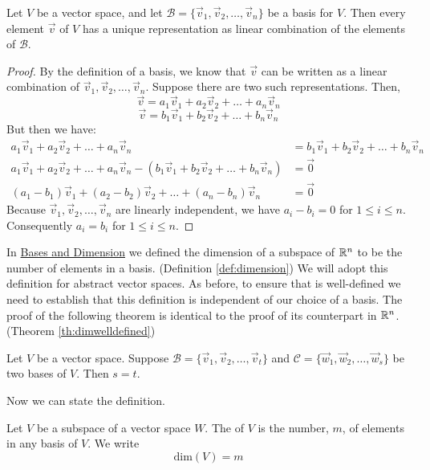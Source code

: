 \documentclass{ximera}
\begin{document}
\begin{theorem}\label{th:uniquerep}
Let $V$ be a vector space, and let $\mathcal{B}=\{\vec{v}_1, \vec{v}_2,\ldots,\vec{v}_n\}$ be a basis for $V$.  Then every element $\vec{v}$ of $V$ has a unique representation as linear combination of the elements of $\mathcal{B}$.
\end{theorem}
\begin{proof}
By the definition of a basis, we know that $\vec{v}$ can be written as a linear combination of $\vec{v}_1, \vec{v}_2,\ldots,\vec{v}_n$.  Suppose there are two such representations.  Then,
$$\vec{v}=a_1\vec{v}_1+ a_2\vec{v}_2+\ldots+a_n\vec{v}_n$$
$$\vec{v}=b_1\vec{v}_1+ b_2\vec{v}_2+\ldots+b_n\vec{v}_n$$
But then we have:
\begin{align*}
a_1\vec{v}_1+ a_2\vec{v}_2+\ldots+a_n\vec{v}_n&=b_1\vec{v}_1+ b_2\vec{v}_2+\ldots+b_n\vec{v}_n\\
a_1\vec{v}_1+ a_2\vec{v}_2+\ldots+a_n\vec{v}_n-(b_1\vec{v}_1+ b_2\vec{v}_2+\ldots+b_n\vec{v}_n)&=\vec{0}\\
(a_1-b_1)\vec{v}_1+ (a_2-b_2)\vec{v}_2+\ldots+(a_n-b_n)\vec{v}_n&=\vec{0}
\end{align*}
Because $\vec{v}_1, \vec{v}_2,\ldots,\vec{v}_n$ are linearly independent, we have $a_i-b_i=0$ for $1\leq i\leq n$. Consequently $a_i=b_i$ for $1\leq i\leq n$.
\end{proof}

In \href{https://ximera.osu.edu/linearalgebradzv3/LinearAlgebraInteractiveIntro/VSP-0035/main}{Bases and Dimension} we defined the dimension of a subspace of $\mathbb{R}^n$ to be the number of elements in a basis. (Definition \ref{def:dimension})  We will adopt this definition for abstract vector spaces.  As before, to ensure that  is well-defined we need to establish that this definition is independent of our choice of a basis.  The proof of the following theorem is identical to the proof of its counterpart in $\mathbb{R}^n$.  (Theorem \ref{th:dimwelldefined})

\begin{theorem}\label{th:dimwelldefinedabstract}
Let $V$ be a vector space.  Suppose $\mathcal{B}=\{\vec{v}_1, \vec{v}_2,\ldots ,\vec{v}_t\}$ and $\mathcal{C}=\{\vec{w}_1, \vec{w}_2,\ldots ,\vec{w}_s\}$ be two bases of $V$.  Then $s=t$.
\end{theorem}
Now we can state the definition.

\begin{definition}\label{def:dimensionabstract}
Let $V$ be a subspace of a vector space $W$.  The  of $V$ is the number, $m$, of elements in any basis of $V$.  We write
$$\mbox{dim}(V)=m$$
\end{definition}
\end{document}
